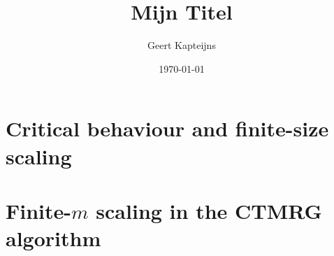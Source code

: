 \documentclass[9pt, ebook, openany, oneside]{memoir}
\renewcommand{\afterchaptertitle}{%
 \vskip2em
 \hrule height 0.6pt
 \vskip2em
 }
\begin{document}
\pagestyle{simple}



\frontmatter

\title{Mijn Titel}
\author{Geert Kapteijns}
\date{\today}


\begingroup
\renewcommand{\afterchaptertitle}{\vskip1.5em}

\tableofcontents*
\endgroup

\mainmatter

% 
% 
%
% 
%
\chapter{Critical behaviour and finite-size scaling}


\chapter{Finite-$m$ scaling in the CTMRG algorithm}

%

% 
%
\end{document}
